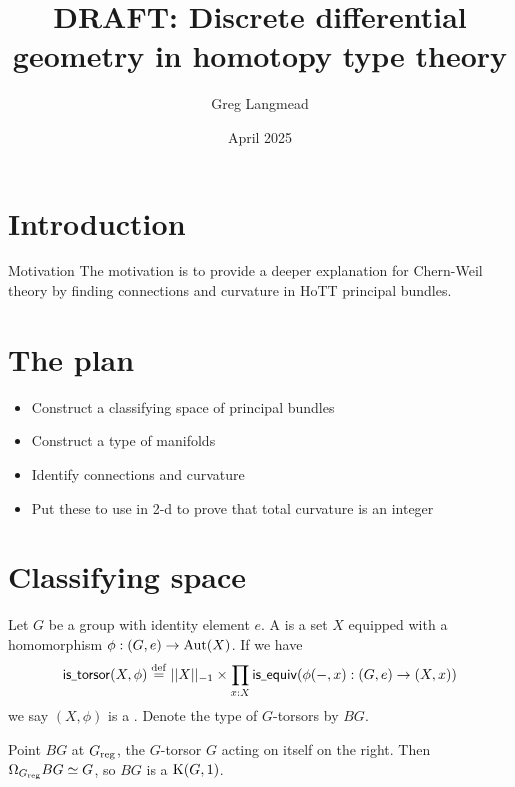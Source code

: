 \documentclass[14pt,aspectratio=169,compress]{beamer}
\title[Geometry in HoTT]{DRAFT: Discrete differential geometry in homotopy type theory}
\author{Greg Langmead}
\institute[CMU]{Carnegie Mellon University}
\date{April 2025}
\begin{document}
\begin{frame}
\titlepage
\end{frame}

\begin{frame}
\tableofcontents
\end{frame}

\section{Introduction}

\begin{frame}{Motivation}
The motivation is to provide \alert{a deeper explanation} for \alert{Chern-Weil theory} by finding \alert{connections} and \alert{curvature} in HoTT \alert{principal bundles}.
\end{frame}


\section{The plan}
\begin{frame}
\begin{itemize}
\item Construct a classifying space of principal bundles
\item Construct a type of manifolds
\item Identify connections and curvature
\item Put these to use in 2-d to prove that total curvature is an integer
\end{itemize}
\end{frame}

\section{Classifying space}

\begin{frame}
\begin{definition}
Let \( G \) be a group with identity element \( e \). A  is a set \( X \) equipped with a homomorphism \( \phi:(G,e)\to\operatorname{Aut}(X) \). If we have
\[ 
\mathsf{is\underscore torsor}(X,\phi)\defeq ||X||_{-1}\times \pit{x:X}\mathsf{is\underscore equiv}(\phi(-,x):(G,e)\to (X,x))
\] we say \( (X,\phi) \) is a . Denote the type of \( G \)-torsors by \( BG \).
\end{definition}
\begin{lemma}
Point \( BG \) at \( {G}_\mathrm{reg} \), the \( G \)-torsor \( G \) acting on itself on the right. Then \( \Omega_{{G}_\mathrm{reg}} BG \simeq G \), so \( BG \) is a \( \mathrm{K}(G,1) \).
\end{lemma}
\end{frame}
\end{document}
